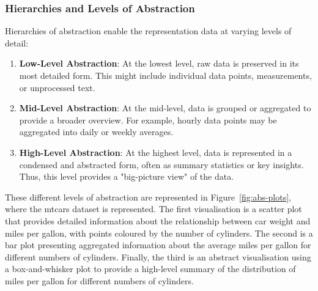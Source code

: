 \documentclass{article}\usepackage[]{graphicx}\usepackage[]{xcolor}
\numberwithin{equation}{section}
\begin{document}
\subsubsection{Hierarchies and Levels of Abstraction}
Hierarchies of abstraction enable the representation data at varying levels of detail: 
\begin{enumerate}
    \item \textbf{Low-Level Abstraction}: At the lowest level, raw data is preserved in its most detailed form. This might include individual data points, measurements, or unprocessed text.
    \item \textbf{Mid-Level Abstraction}: At the mid-level, data is grouped or aggregated to provide a broader overview. For example, hourly data points may be aggregated into daily or weekly averages.
    \item \textbf{High-Level Abstraction}: At the highest level, data is represented in a condensed and abstracted form, often as summary statistics or key insights. Thus, this level provides a "big-picture view" of the data.
\end{enumerate}

\noindent 
These different levels of abstraction are represented in Figure~\ref{fig:abs-plots}, where the mtcars dataset is represented. The first visualisation is a scatter plot that provides detailed information about the relationship between car weight and miles per gallon, with points coloured by the number of cylinders. The second is a bar plot presenting aggregated information about the average miles per gallon for different numbers of cylinders. Finally, the third is an abstract visualisation using a box-and-whisker plot to provide a high-level summary of the distribution of miles per gallon for different numbers of cylinders.
\end{document}
